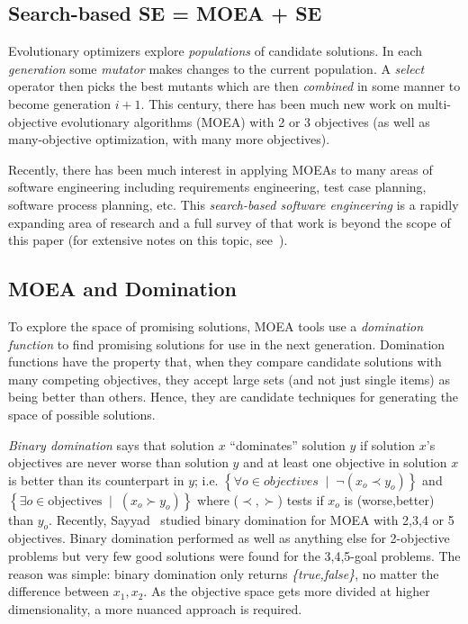 \documentclass[10pt,journal,compsoc]{IEEEtran}
\begin{document}
  
\subsection{Search-based SE = MOEA + SE}\label{sec:abutsbse}\label{sec:w}

Evolutionary optimizers explore {\em populations} of candidate solutions.
In each {\em generation} some {\em mutator} makes changes to the current population. 
A {\em select} operator then picks the best mutants which are then {\em combined} in some manner to become generation $i+1$.
This century, there has been much new work on multi-objective evolutionary algorithms (MOEA) with 2 or 3 objectives (as well as many-objective optimization, with many more objectives).    

Recently, there has been much interest in applying MOEAs to many areas of software engineering including requirements engineering, test case planning, software process planning, etc. 
This {\em search-based software engineering} is a  rapidly expanding area of research and a full survey of that work is beyond the scope of this paper (for extensive notes on this topic, see~\cite{harman12abc,harman14}). 

 

\subsection{MOEA and Domination}\label{sec:cdom}

To explore the space of promising solutions, MOEA tools use a {\em  domination function} to find promising solutions for use in the next generation. 
Domination functions have the property that, when they compare candidate solutions with many competing objectives, they accept large sets (and not just single items) as being better than others.
Hence, they are candidate techniques for generating the space of possible solutions.

{\em Binary domination} says that solution $x$ ``dominates''
solution $y$ if solution $x$'s objectives are never worse than solution $y$ and at least one objective in solution $x$ is better than its counterpart in $y$; i.e.
 $\left\{ \forall o  \in \textit{objectives}\;\mid\; \neg ( x_o \prec y_o )\right\}$
and
 $\left\{
\exists o \in \text{objectives} \;\mid\; ( x_o \succ y_o ) \right\}$
where ($\prec,\succ$) tests if $x_o$ is (worse,better) than $y_o$.
Recently, Sayyad~\cite{sayyad13a} studied binary domination for MOEA with 2,3,4 or 5 objectives.  
Binary domination performed as well as anything else for 2-objective problems but very few good solutions were found for the 3,4,5-goal problems.  
The reason was simple: binary domination  only returns {\em \{true,false\}}, no matter the difference between $x_1,x_2$. 
As the objective space gets more divided at higher dimensionality, a more nuanced approach is required.
\end{document}
